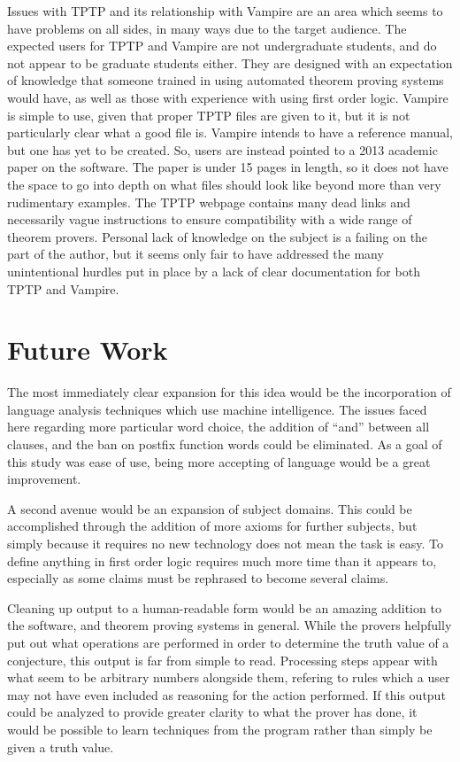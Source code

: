 Issues with TPTP and its relationship with Vampire are an area which seems to have problems on all sides, in many ways due to the target audience. The expected users for TPTP and Vampire are not undergraduate students, and do not appear to be graduate students either. They are designed with an expectation of knowledge that someone trained in using automated theorem proving systems would have, as well as those with experience with using first order logic. Vampire is simple to use, given that proper TPTP files are given to it, but it is not particularly clear what a good file is. Vampire intends to have a reference manual, but one has yet to be created. So, users are instead pointed to a 2013 academic paper on the software. The paper is under 15 pages in length, so it does not have the space to go into depth on what files should look like beyond more than very rudimentary examples. The TPTP webpage contains many dead links and necessarily vague instructions to ensure compatibility with a wide range of theorem provers. Personal lack of knowledge on the subject is a failing on the part of the author, but it seems only fair to have addressed the many unintentional hurdles put in place by a lack of clear documentation for both TPTP and Vampire.

\section{Future Work}

The most immediately clear expansion for this idea would be the incorporation of language analysis techniques which use machine intelligence. The issues faced here regarding more particular word choice, the addition of ``and'' between all clauses, and the ban on postfix function words could be eliminated. As a goal of this study was ease of use, being more accepting of language would be a great improvement.

A second avenue would be an expansion of subject domains. This could be accomplished through the addition of more axioms for further subjects, but simply because it requires no new technology does not mean the task is easy. To define anything in first order logic requires much more time than it appears to, especially as some claims must be rephrased to become several claims.

Cleaning up output to a human-readable form would be an amazing addition to the software, and theorem proving systems in general. While the provers helpfully put out what operations are performed in order to determine the truth value of a conjecture, this output is far from simple to read. Processing steps appear with what seem to be arbitrary numbers alongside them, refering to rules which a user may not have even included as reasoning for the action performed. If this output could be analyzed to provide greater clarity to what the prover has done, it would be possible to learn techniques from the program rather than simply be given a truth value.

